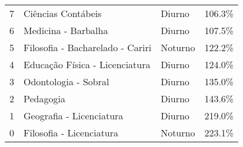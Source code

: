 \begin{tabular}{llll}
7  &                  Ciências Contábeis &   Diurno &  106.3\% \\
6  &                 Medicina - Barbalha &   Diurno &  107.5\% \\
5  &    Filosofia - Bacharelado - Cariri &  Noturno &  122.2\% \\
4  &      Educação Física - Licenciatura &   Diurno &  124.0\% \\
3  &                Odontologia - Sobral &   Diurno &  135.0\% \\
2  &                           Pedagogia &   Diurno &  143.6\% \\
1  &            Geografia - Licenciatura &   Diurno &  219.0\% \\
0  &            Filosofia - Licenciatura &  Noturno &  223.1\% \\
\bottomrule
\end{tabular}
